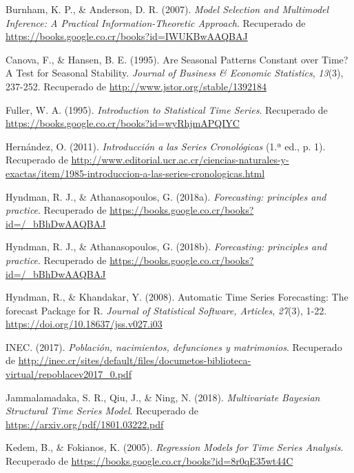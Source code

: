\documentclass[
]{article}
\begin{document}
\leavevmode\hypertarget{ref-burnham2007model}{}%
Burnham, K. P., \& Anderson, D. R. (2007). \emph{Model Selection and
Multimodel Inference: A Practical Information-Theoretic Approach}.
Recuperado de \url{https://books.google.co.cr/books?id=IWUKBwAAQBAJ}

\leavevmode\hypertarget{ref-10.2307ux2f1392184}{}%
Canova, F., \& Hansen, B. E. (1995). Are Seasonal Patterns Constant over
Time? A Test for Seasonal Stability. \emph{Journal of Business \&
Economic Statistics}, \emph{13}(3), 237-252. Recuperado de
\url{http://www.jstor.org/stable/1392184}

\leavevmode\hypertarget{ref-fuller1995introduction}{}%
Fuller, W. A. (1995). \emph{Introduction to Statistical Time Series}.
Recuperado de \url{https://books.google.co.cr/books?id=wyRhjmAPQIYC}

\leavevmode\hypertarget{ref-oscarh-1}{}%
Hernández, O. (2011). \emph{Introducción a las Series Cronológicas} (1.ª
ed., p. 1). Recuperado de
\url{http://www.editorial.ucr.ac.cr/ciencias-naturales-y-exactas/item/1985-introduccion-a-las-series-cronologicas.html}

\leavevmode\hypertarget{ref-hyndman2018forecasting}{}%
Hyndman, R. J., \& Athanasopoulos, G. (2018a). \emph{Forecasting:
principles and practice}. Recuperado de
\url{https://books.google.co.cr/books?id=/_bBhDwAAQBAJ}

\leavevmode\hypertarget{ref-hyndman_box-jenkins}{}%
Hyndman, R. J., \& Athanasopoulos, G. (2018b). \emph{Forecasting:
principles and practice}. Recuperado de
\url{https://books.google.co.cr/books?id=/_bBhDwAAQBAJ}

\leavevmode\hypertarget{ref-auto.arima}{}%
Hyndman, R., \& Khandakar, Y. (2008). Automatic Time Series Forecasting:
The forecast Package for R. \emph{Journal of Statistical Software,
Articles}, \emph{27}(3), 1-22.
\url{https://doi.org/10.18637/jss.v027.i03}

\leavevmode\hypertarget{ref-calidad_vitales}{}%
INEC. (2017). \emph{Población, nacimientos, defunciones y matrimonios}.
Recuperado de
\url{http://inec.cr/sites/default/files/documetos-biblioteca-virtual/repoblacev2017_0.pdf}

\leavevmode\hypertarget{ref-bayes}{}%
Jammalamadaka, S. R., Qiu, J., \& Ning, N. (2018). \emph{Multivariate
Bayesian Structural Time Series Model}. Recuperado de
\url{https://arxiv.org/pdf/1801.03222.pdf}

\leavevmode\hypertarget{ref-kedem}{}%
Kedem, B., \& Fokianos, K. (2005). \emph{Regression Models for Time
Series Analysis}. Recuperado de
\url{https://books.google.co.cr/books?id=8r0qE35wt44C}
\end{document}
